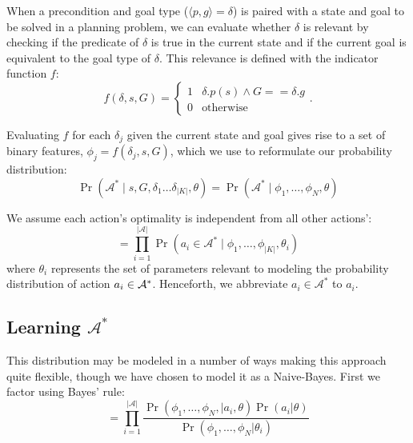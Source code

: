 \documentclass[letterpaper]{article}
\begin{document}
When a precondition and goal type ($\langle p , g \rangle = \delta$) is paired with a
state and goal to be solved in a planning problem, we can evaluate whether $\delta$
is relevant by checking if the predicate of $\delta$ is true in the current state and if 
the current goal is equivalent to the goal type of $\delta$. This relevance is defined with the indicator function $f$:
\begin{equation}
f(\delta, s, G) = 
\begin{cases}
1& \delta.p(s) \wedge G == \delta.g \\
0& \text{otherwise}
\end{cases}.
\label{eq:f_func_def}
\end{equation}

Evaluating $f$ for each $\delta_j$ given the current state and goal gives rise to a set of binary features,
$\phi_j = f(\delta_j, s, G)$, which we use to reformulate our probability distribution:
\begin{equation}
\Pr(\mathcal{A}^* \mid s, G, \delta_1 \ldots \delta_{|K|}, \theta) = \Pr(\mathcal{A}^* \mid \phi_1, \ldots, \phi_{N}, \theta)
\label{eq:feature_rep}
\end{equation}

We assume each action's optimality is independent from all other actions':
\begin{equation}
= \prod_{i=1}^{|\mathcal{A}|} \Pr(a_i \in \mathcal{A}^* \mid \phi_1, \ldots, \phi_{|K|}, \theta_i)
\label{eq:action_independ}
\end{equation}
where $\theta_i$ represents the set of parameters relevant to modeling the probability
distribution of action $a_i \in {\cal A}^*$. Henceforth, we abbreviate $a_i \in \mathcal{A}^*$ to $a_i$.

\subsection{Learning $\mathcal{A}^*$}

This distribution may be modeled in a number of ways making this approach
quite flexible, though we have chosen to model it as a Naive-Bayes. First we factor using Bayes' rule:
\begin{equation}
= \prod_{i=1}^{|\mathcal{A}|} \frac{\Pr(\phi_1, \ldots, \phi_{N}, \mid a_i, \theta) \Pr(a_i | \theta)}{\Pr(\phi_1, \ldots, \phi_{N} | \theta_i)}
\label{eq:bayes}
\end{equation}
\end{document}

